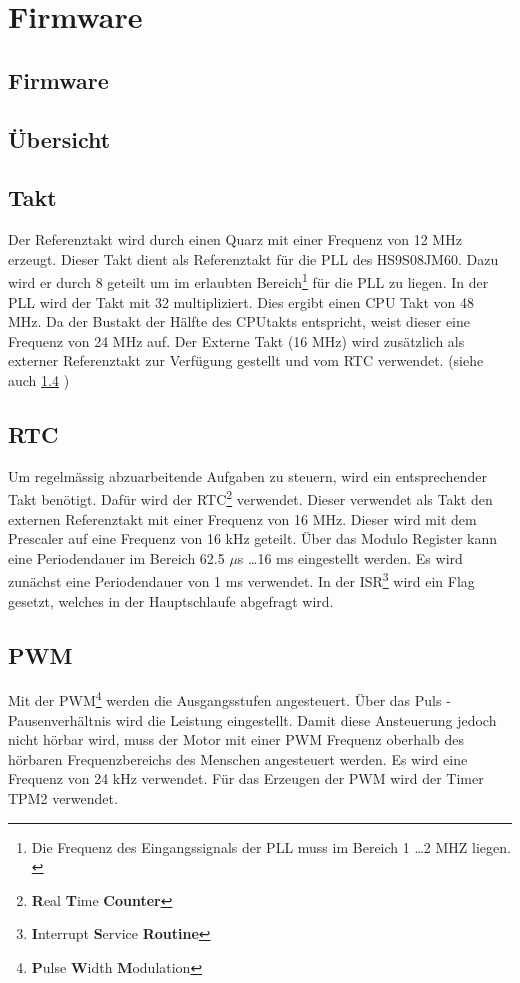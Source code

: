 \ifSTANDALONE
\section{Firmware}
\fi
\ifEMBED
\subsection{Firmware}
\fi

\subsection{Übersicht}

\subsection{Takt}
Der Referenztakt wird durch einen Quarz mit einer Frequenz von 12 MHz erzeugt. 
Dieser Takt dient als Referenztakt für die PLL des HS9S08JM60. Dazu wird er 
durch 8 geteilt um im erlaubten Bereich\footnote{Die Frequenz des 
Eingangssignals der PLL muss im Bereich 1 \ldots 2 MHZ liegen. \cite[p. 
195]{Datasheet:HCS08}} für die PLL zu liegen. In der PLL wird der Takt mit 32 
multipliziert. Dies ergibt einen CPU Takt von 48 MHz. Da der Bustakt der 
Hälfte des CPUtakts entspricht, weist dieser eine Frequenz von 24 MHz auf. 
Der Externe Takt (16 MHz) wird zusätzlich als externer Referenztakt zur 
Verfügung gestellt und vom RTC verwendet. 
(siehe auch \ref{sec:rtc} )

\subsection{RTC}
\label{sec:rtc}
Um regelmässig abzuarbeitende Aufgaben zu steuern, wird ein entsprechender 
Takt benötigt. Dafür wird der RTC\footnote{\textbf{R}eal \textbf{T}ime 
\textbf{Counter}} verwendet. Dieser verwendet als Takt den externen 
Referenztakt mit einer Frequenz von 16 MHz. Dieser wird mit dem Prescaler auf 
eine Frequenz von 16 kHz geteilt. Über das Modulo Register kann eine 
Periodendauer im Bereich 62.5 $\mu$s \ldots 16 ms eingestellt werden. Es wird 
zunächst eine Periodendauer von 1 ms verwendet. In der 
ISR\footnote{\textbf{I}nterrupt \textbf{S}ervice \textbf{Routine}} wird ein 
Flag gesetzt, welches in der Hauptschlaufe abgefragt wird. 

\subsection{PWM}
Mit der PWM\footnote{\textbf{P}ulse \textbf{W}idth \textbf{M}odulation} 
werden die Ausgangsstufen angesteuert. Über das Puls - Pausenverhältnis wird 
die Leistung eingestellt. Damit diese Ansteuerung jedoch nicht hörbar wird, 
muss der Motor mit einer PWM Frequenz oberhalb des hörbaren Frequenzbereichs 
des Menschen angesteuert werden. Es wird eine Frequenz von 24 kHz verwendet. 
Für das Erzeugen der PWM wird der Timer TPM2 verwendet. 

